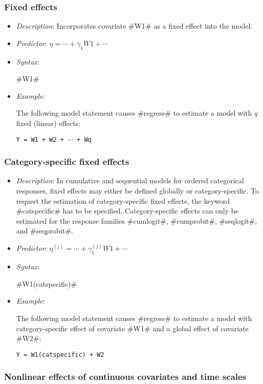 \subsubsection*{Fixed effects}

\begin{itemize}
\item[] {\em Description}: Incorporates covariate #W1# as a fixed effect into the model.
\item[] {\em Predictor}: $\eta =  \cdots + \gamma_1 W1 + \cdots$
\item[] {\em Syntax}:

#W1#
\item[] {\em Example}:

The following model statement causes #regress# to estimate a model
with $q$ fixed (linear) effects:

\texttt{Y = W1 + W2 + $\cdots$ + Wq}
\end{itemize}

\subsubsection*{Category-specific fixed
effects}

\begin{itemize}
\item[] {\em Description}: In cumulative and sequential models for
ordered categorical responses, fixed effects may either be defined
globally or category-specific. To request the estimation of
category-specific fixed effects, the keyword #catspecific# has to
be specified. Category-specific effects can only be estimated for
the response families #cumlogit#, #cumprobit#, #seqlogit#, and
#seqprobit#.
\item[] {\em Predictor}: $\eta^{(j)} =  \cdots +
\gamma_1^{(j)} W1 + \cdots$ \item[] {\em Syntax}:

#W1(catspecific)#
\item[] {\em Example}:

The following model statement causes #regress# to estimate a model
with category-specific effect of covariate #W1# and a global
effect of covariate #W2#:

\texttt{Y = W1(catspecific) + W2}
\end{itemize}

\subsubsection*{Nonlinear effects of continuous covariates and time
scales}

